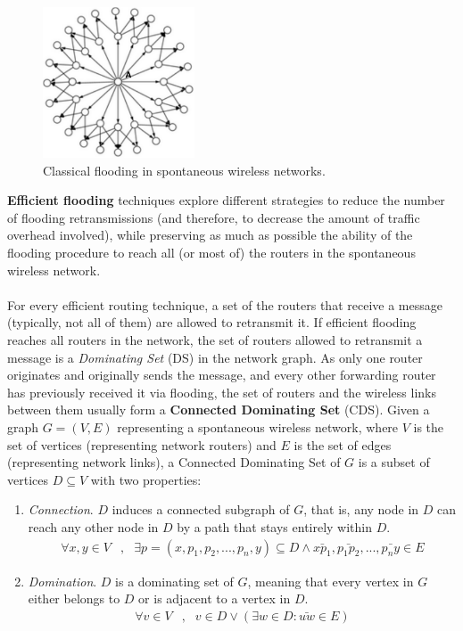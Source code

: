 \begin{figure}[h]
\centering
\includegraphics[width=0.4\textwidth]{Figures/purebc-crop.pdf}
\caption{Classical flooding in spontaneous wireless networks.}
\label{f:excessive}
\end{figure}

{\bf Efficient flooding} techniques explore different strategies to reduce the number of flooding retransmissions (and therefore, to decrease the amount of traffic overhead involved), while preserving as much as possible the ability of the flooding procedure to reach all (or most of) the routers in the spontaneous wireless network. \ \\ \ \\
%
For every efficient routing technique, a set of the routers that receive a message (typically, not all of them) are allowed to retransmit it. If efficient flooding reaches all routers in the network, the set of routers allowed to retransmit a message is a {\em Dominating Set} (DS) in the network graph. As only one router originates and originally sends the message, and every other forwarding router has previously received it via flooding, the set of routers and the wireless links between them usually form a {\bf Connected Dominating Set} (CDS). Given a graph $G=(V,E)$ representing a spontaneous wireless network, where $V$ is the set of vertices (representing network routers) and $E$ is the set of edges (representing network links), a Connected Dominating Set of $G$ is a subset of vertices $D \subseteq V$ with two properties:


\begin{enumerate}
\item {\em Connection}. $D$ induces a connected subgraph of $G$, that is, any node in $D$ can reach any other node in $D$ by a path that stays entirely within $D$. 
	\begin{align*}
	\forall x, y \in V &,& \exists p=(x, p_1, p_2, ..., p_n, y) \subseteq D \wedge \bar{xp_1}, \bar{p_1p_2}, ..., \bar{p_ny} \in E
	\end{align*}
\item {\em Domination}. $D$ is a dominating set of $G$, meaning that every vertex in $G$ either belongs to $D$ or is adjacent to a vertex in $D$.
	\begin{align*} 
	\forall v \in V &,& v \in D \vee ( \exists w \in D : \bar{uw} \in E )
	\end{align*}
\end{enumerate} 

